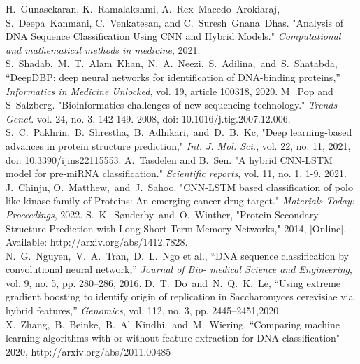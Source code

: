 \documentclass[journal]{IEEEtran}
\begin{document}
\begin{thebibliography}{1}

  H.~Gunasekaran, K.~Ramalakshmi, A.~Rex~Macedo~Arokiaraj, S.~Deepa~Kanmani, C.~Venkatesan, and C.~Suresh~Gnana~Dhas.
  "Analysis of DNA Sequence Classification Using CNN and Hybrid Models." 
  \emph{Computational and mathematical methods in medicine}, 2021.
  S.~Shadab,~M.~T.~Alam~Khan,~N.~A.~Neezi,~S.~Adilina,~and~S.~Shatabda, 
  “DeepDBP: deep neural networks for identification of DNA-binding proteins,” 
  \emph{Informatics in Medicine Unlocked}, vol. 19, article 100318, 2020.
  M~.Pop and S~Salzberg. "Bioinformatics challenges of new sequencing technology." 
  \emph{Trends Genet}. vol. 24, no. 3, 142-149. 2008, doi: 10.1016/j.tig.2007.12.006.
  S.~C.~Pakhrin,~B.~Shrestha,~B.~Adhikari,~and~D.~B.~Kc, 
  "Deep learning-based advances in protein structure prediction," 
  \emph{Int. J. Mol. Sci.}, vol. 22, no. 11, 2021, doi: 10.3390/ijms22115553.
  A.~Tasdelen and B.~Sen. "A hybrid CNN-LSTM model for pre-miRNA classification."
  \emph{Scientific reports}, vol. 11, no. 1, 1-9. 2021.
  J.~Chinju, O.~Matthew,~and~J.~Sahoo. "CNN-LSTM based classification of polo like kinase family of Proteins: An emerging cancer drug target." 
  \emph{Materials Today: Proceedings}, 2022.
  S.~K.~Sønderby~and~O.~Winther, "Protein Secondary Structure Prediction with Long Short Term Memory Networks," 2014, 
  [Online]. Available: http://arxiv.org/abs/1412.7828.
  N.~G.~Nguyen,~V.~A.~Tran,~D.~L.~Ngo et al., “DNA sequence classification by convolutional neural network,” \emph{Journal of Bio-
  medical Science and Engineering}, vol. 9, no. 5, pp. 280–286, 2016.
  D.~T.~Do~and~N.~Q.~K.~Le, “Using extreme gradient boosting to identify origin of replication in Saccharomyces cerevisiae via
  hybrid features,” \emph{Genomics}, vol. 112, no. 3, pp. 2445–2451,2020
  X.~Zhang,~B.~Beinke,~B.~Al~Kindhi,~and~M.~Wiering, “Comparing machine learning algorithms with or without feature extraction for DNA classification"
  2020, http://arxiv.org/abs/2011.00485

\end{thebibliography}
\end{document}

